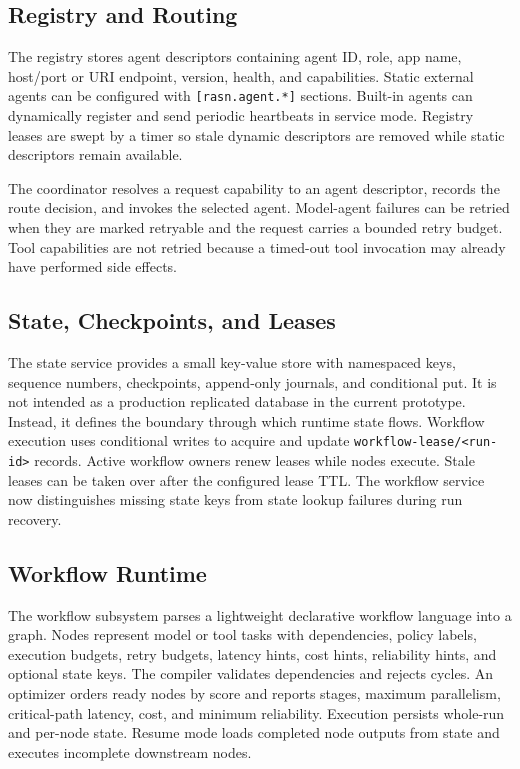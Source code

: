 \documentclass[manuscript,screen,review]{acmart}
\begin{document}
\subsection{Registry and Routing}

The registry stores agent descriptors containing agent ID, role, app name,
host/port or URI endpoint, version, health, and capabilities. Static external
agents can be configured with \texttt{[rasn.agent.*]} sections. Built-in agents
can dynamically register and send periodic heartbeats in service mode. Registry
leases are swept by a timer so stale dynamic descriptors are removed while
static descriptors remain available.

The coordinator resolves a request capability to an agent descriptor, records
the route decision, and invokes the selected agent. Model-agent failures can be
retried when they are marked retryable and the request carries a bounded retry
budget. Tool capabilities are not retried because a timed-out tool invocation
may already have performed side effects.

\subsection{State, Checkpoints, and Leases}

The state service provides a small key-value store with namespaced keys,
sequence numbers, checkpoints, append-only journals, and conditional put. It is
not intended as a production replicated database in the current prototype.
Instead, it defines the boundary through which runtime state flows. Workflow
execution uses conditional writes to acquire and update
\texttt{workflow-lease/<run-id>} records. Active workflow owners renew leases
while nodes execute. Stale leases can be taken over after the configured lease
TTL. The workflow service now distinguishes missing state keys from state
lookup failures during run recovery.

\subsection{Workflow Runtime}

The workflow subsystem parses a lightweight declarative workflow language into
a graph. Nodes represent model or tool tasks with dependencies, policy labels,
execution budgets, retry budgets, latency hints, cost hints, reliability hints,
and optional state keys. The compiler validates dependencies and rejects cycles.
An optimizer orders ready nodes by score and reports stages, maximum
parallelism, critical-path latency, cost, and minimum reliability. Execution
persists whole-run and per-node state. Resume mode loads completed node outputs
from state and executes incomplete downstream nodes.
\end{document}
